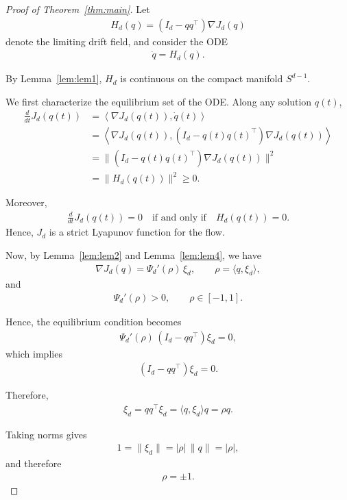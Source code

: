 \documentclass[10pt,a4paper]{amsart}
\begin{document}
\begin{proof}[Proof of Theorem~\ref{thm:main}]
Let
\begin{align*}
H_d(q)
=
(I_d - qq^\top)\nabla J_d(q)
\end{align*}
denote the limiting drift field, and consider the ODE
\begin{align}
\dot q = H_d(q).
\end{align}

By Lemma~\ref{lem:lem1}, $H_d$ is continuous on the compact manifold $S^{d-1}$.

We first characterize the equilibrium set of the ODE. Along any solution $q(t)$,
\begin{align*}
\frac{d}{dt}J_d(q(t))
&=
\left\langle \nabla J_d(q(t)), \dot q(t) \right\rangle \\
&=
\left\langle \nabla J_d(q(t)), (I_d - q(t)q(t)^\top)\nabla J_d(q(t)) \right\rangle \\
&=
\|(I_d - q(t)q(t)^\top)\nabla J_d(q(t))\|^2 \\
&=
\|H_d(q(t))\|^2 \ge 0.
\end{align*}

Moreover,
\begin{align}
\frac{d}{dt}J_d(q(t)) = 0
\quad \text{if and only if} \quad
H_d(q(t)) = 0.
\end{align}
Hence, $J_d$ is a strict Lyapunov function for the flow.

Now, by Lemma~\ref{lem:lem2} and Lemma~\ref{lem:lem4}, we have
\begin{align}
\nabla J_d(q)
=
\Psi_d'(\rho)\,\xi_d,
\qquad
\rho=\langle q,\xi_d\rangle,
\end{align}
and
\begin{align}
\Psi_d'(\rho) > 0,
\qquad
\rho \in [-1,1].
\end{align}

Hence, the equilibrium condition becomes
\begin{align}
\Psi_d'(\rho)\,(I_d - qq^\top)\xi_d = 0,
\end{align}
which implies
\begin{align}
(I_d - qq^\top)\xi_d = 0.
\end{align}

Therefore,
\begin{align}
\xi_d
=
qq^\top\xi_d
=
\langle q,\xi_d\rangle q
=
\rho q.
\end{align}

Taking norms gives
\begin{align}
1 = \|\xi_d\|
=
|\rho|\,\|q\|
=
|\rho|,
\end{align}
and therefore
\begin{align}
\rho = \pm 1.
\end{align}


\end{proof}
\end{document}
